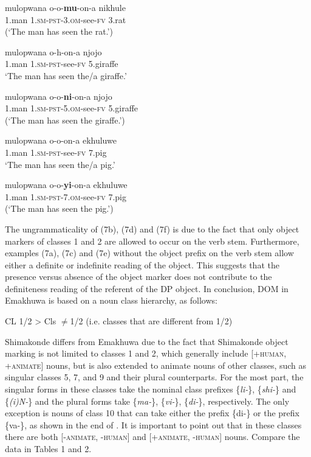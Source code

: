 \documentclass[output=paper]{langsci/langscibook}
\begin{document}
\ea
\gll *mulopwana        o-o-\textbf{mu}{}-on-a                        nikhule\\
     {1.man                  1.}{\textsc{sm-pst}}{{}-3.}{\textsc{om-}}{see}{\textsc{{}-fv}}         {3.rat}\\
\glt (‘The man has seen the rat.’)
\z

\ea
\gll mulopwana         o\textup{{}-}h-on-a                       njojo\\
     {1.man                 }{\textsc{1.sm-pst}}{{}-see-}{\textsc{fv}}           {5.giraffe}\\
\glt ‘The man has seen the/a giraffe.’
\z

\ea
\gll *mulopwana        o-o-\textbf{ni}{}-on-a                         njojo\\
     {1.man                  1}{\textsc{.sm-pst}}{{}-5.}{\textsc{om}}{{}-see-}{\textsc{fv}}        {5.giraffe}\\
\glt (‘The man has seen the giraffe.’)
\z

\ea
\gll mulopwana           o-o-on-a                           ekhuluwe\\
     {1.man                   1.}{\textsc{sm-pst}}{{}-see-}{\textsc{fv}}               {7.pig}\\
\glt ‘The man has seen the/a pig.’
\z

\ea
\gll *mulopwana         o-o-\textbf{yi}{}-on-a                           ekhuluwe\\
     {1.man                   1.}{\textsc{sm-pst}}{{}-7.}{\textsc{om}}{{}-see-}{\textsc{fv}}          {7.pig}\\
\glt (‘The man has seen the pig.’)
\z

The ungrammaticality of (7b), (7d) and (7f) is due to the fact that only object markers of classes 1 and 2 are allowed to occur on the verb stem. Furthermore, examples (7a), (7c) and (7e) without the object prefix on the verb stem allow either a definite or indefinite reading of the object. This suggests that the presence versus absence of the object marker does not contribute to the definiteness reading of the referent of the DP object. In conclusion, DOM in Emakhuwa is based on a noun class hierarchy, as follows:

\ea
  {{}CL 1/2 {\textgreater} Cls ${\neq}$1/2 (i.e. classes that are different from 1/2)}
\z

{Shimakonde differs from Emakhuwa due to the fact that Shimakonde object marking is not limited to classes 1 and 2, which generally include [+}{\textsc{human}}{, +}{\textsc{animate}}{] nouns, but is also extended to animate nouns of other classes, such as singular classes 5, 7, and 9 and their plural counterparts.} {For the most part, }{the singular forms in these classes take the nominal class prefixes \{}{\textit{li-}}{\}, \{}{\textit{shi-}}{\} and \{}{\textit{(i)N-}}{\} and the plural forms take \{}{\textit{ma-}}{\}, \{}{\textit{vi-}}{\}, \{}{\textit{di-}}{\}, respectively. The only exception is nouns of class 10 that can take either the prefix \{di-\} or the prefix \{va-\}, as shown in the end of . }{It is important to point out that} {in these classes there are both [-}{\textsc{animate, -human}}{] and [+}{\textsc{animate, -human}}{] nouns. Compare the data in Tables 1 and 2.}
\end{document}
